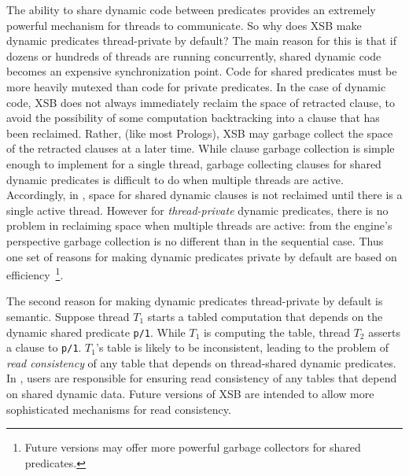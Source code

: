 The ability to share dynamic code between predicates provides an
extremely powerful mechanism for threads to communicate.  So why does
XSB make dynamic predicates thread-private by default?  The main
reason for this is that if dozens or hundreds of threads are running
concurrently, shared dynamic code becomes an expensive synchronization
point.  Code for shared predicates must be more heavily mutexed than
code for private predicates.  In the case of dynamic code, XSB does
not always immediately reclaim the space of retracted clause, to avoid
the possibility of some computation backtracking into a clause that
has been reclaimed.  Rather, (like most Prologs), XSB may garbage
collect the space of the retracted clauses at a later time.  While
clause garbage collection is simple enough to implement for a single
thread, garbage collecting clauses for shared dynamic predicates is
difficult to do when multiple threads are active.  Accordingly, in
\version , space for shared dynamic clauses is not reclaimed until
there is a single active thread.  However for {\em thread-private}
dynamic predicates, there is no problem in reclaiming space when
multiple threads are active: from the engine's perspective garbage
collection is no different than in the sequential case.  Thus one set
of reasons for making dynamic predicates private by default are based
on efficiency~\footnote{Future versions may offer more powerful
  garbage collectors for shared predicates.}.

The second reason for making dynamic predicates thread-private by
default is semantic.  Suppose thread $T_1$ starts a tabled computation
that depends on the dynamic shared predicate {\tt p/1}.  While $T_1$
is computing the table, thread $T_2$ asserts a clause to {\tt p/1}.
$T_1$'s table is likely to be inconsistent, leading to the problem of
{\em read consistency} of any table that depends on thread-shared
dynamic predicates.  In \version , users are responsible for ensuring
read consistency of any tables that depend on shared dynamic data.
Future versions of XSB are intended to allow more sophisticated
mechanisms for read consistency.

